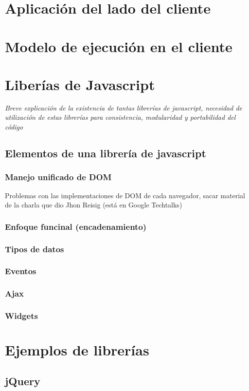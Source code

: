 \documentclass[a4paper]{report}
\begin{document}
\section{Aplicación del lado del cliente}
\section{Modelo de ejecución en el cliente}
\section{Liberías de Javascript}
\emph{Breve explicación de la existencia de tantas librerías de javascript,
necesidad de utilización de estas librerías para consistencia, modularidad y
portabilidad del código}
\subsection{Elementos de una librería de javascript}


\subsubsection{Manejo unificado de DOM}
Problemas con las implementaciones de DOM de cada navegador, sacar material de
la charla que dio Jhon Reisig (está en Google Techtalks)


\subsubsection{Enfoque funcinal (encadenamiento) }
\subsubsection{Tipos de datos}
\subsubsection{Eventos}
\subsubsection{Ajax}
\subsubsection{Widgets}

\section{Ejemplos de librerías}
\subsection{jQuery}
\end{document}
